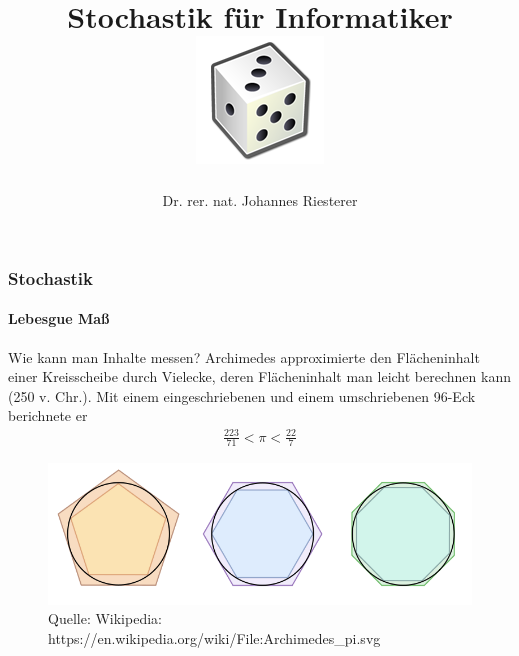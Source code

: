 \documentclass{beamer}
\begin{document}
\title[Stochastik] %
{Stochastik für Informatiker
\\
\includegraphics[scale=0.5]{img/craps}
}
\subtitle{}
\author[Dr. Johannes Riesterer] %
{Dr.  rer. nat. Johannes Riesterer}

\date[KPT 2004] %
{}

\subject{Stochastik}







\begin{frame}
    \frametitle{Stochastik}
\framesubtitle{Lebesgue Maß}
    \begin{block}{Wie kann man Inhalte messen?}
Archimedes approximierte den Flächeninhalt einer Kreisscheibe durch Vielecke, deren Flächeninhalt man leicht berechnen kann (250 v. Chr.).
Mit einem eingeschriebenen und einem umschriebenen 96-Eck berichnete er
\begin{align*}
\frac{223}{71} < \pi < \frac{22}{7}
\end{align*}
\begin{figure}[H]
      \centering
    \includegraphics[width=0.7 \textwidth]{img/750px-Archimedes_pi}
      \caption{Quelle: Wikipedia: https://en.wikipedia.org/wiki/File:Archimedes\_pi.svg}
\end{figure}
\end{block}
 \end{frame}
\end{document}
